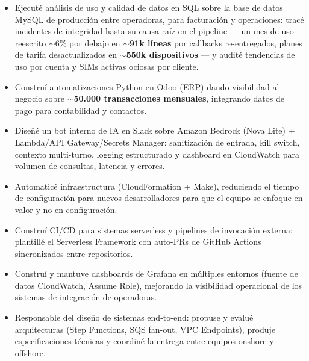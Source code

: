\documentclass[11pt,a4paper]{article}
\begin{document}
\begin{itemize}
        Implementé su contrato y el comando de referencia para Verizon.
  \item Ejecuté análisis de uso y calidad de datos en SQL sobre la base de datos MySQL de
        producción entre operadoras, para facturación y operaciones: tracé incidentes de
        integridad hasta su causa raíz en el pipeline --- un mes de uso reescrito $\sim$6\%
        por debajo en \textbf{$\sim$91k líneas} por callbacks re-entregados, planes de tarifa
        desactualizados en \textbf{$\sim$550k dispositivos} --- y audité tendencias de uso por
        cuenta y SIMs activas ociosas por cliente.
  \item Construí automatizaciones Python en Odoo (ERP) dando visibilidad al negocio sobre
        \textbf{$\sim$50.000 transacciones mensuales}, integrando datos de pago para contabilidad
        y contactos.
  \item Diseñé un bot interno de IA en Slack sobre Amazon Bedrock (Nova Lite) + Lambda/API
        Gateway/Secrets Manager: sanitización de entrada, kill switch, contexto multi-turno,
        logging estructurado y dashboard en CloudWatch para volumen de consultas, latencia y errores.
  \item Automaticé infraestructura (CloudFormation + Make), reduciendo el tiempo de configuración
        para nuevos desarrolladores para que el equipo se enfoque en valor y no en configuración.
  \item Construí CI/CD para sistemas serverless y pipelines de invocación externa; plantillé el
        Serverless Framework con auto-PRs de GitHub Actions sincronizados entre repositorios.
  \item Construí y mantuve dashboards de Grafana en múltiples entornos (fuente de datos
        CloudWatch, Assume Role), mejorando la visibilidad operacional de los sistemas de
        integración de operadoras.
  \item Responsable del diseño de sistemas end-to-end: propuse y evalué arquitecturas (Step
        Functions, SQS fan-out, VPC Endpoints), produje especificaciones técnicas y coordiné
        la entrega entre equipos onshore y offshore.
\end{itemize}
\end{document}
